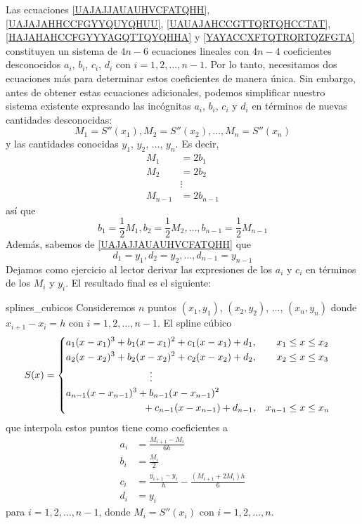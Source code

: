 Las ecuaciones \eqref{UAJAJJAUAUHVCFATQHH}, \eqref{UAJAJAHHCCFGYYQUYQHUU}, \eqref{UAUAJAHCCGTTQRTQHCCTAT}, \eqref{HAJAHAHCCFGYYYAGQTTQYQHHA} y \eqref{YAYACCXFTQTRQRTQZFGTA} constituyen un sistema de $4n - 6$ ecuaciones lineales con $4n - 4$ coeficientes desconocidos $a_i$, $b_i$, $c_i$, $d_i$ con $i = 1, 2, \dots, n-1$. Por lo tanto, necesitamos dos ecuaciones más para determinar estos coeficientes de manera única. Sin embargo, antes de obtener estas ecuaciones adicionales, podemos simplificar nuestro sistema existente expresando las incógnitas $a_i$, $b_i$, $c_i$ y $d_i$ en términos de nuevas cantidades desconocidas:
$$M_1 = S''(x_1), M_2 = S''(x_2), \dots, M_n = S''(x_n)$$
y las cantidades conocidas $y_1$, $y_2$, $\dots$, $y_n$. Es decir,
\begin{align*}
    M_1 & = 2b_1 \\
    M_2 & = 2b_2 \\
    & \vdots \\
    M_{n-1} & = 2b_{n-1}
\end{align*}\newpage\noindent
así que
$$b_1 = \frac{1}{2}M_1, b_2 = \frac{1}{2}M_2, \dots, b_{n-1} = \frac{1}{2}M_{n-1}$$
Además, sabemos de \eqref{UAJAJJAUAUHVCFATQHH} que
$$d_1 = y_1, d_2 = y_2, \dots, d_{n-1} = y_{n-1}$$
Dejamos como ejercicio al lector derivar las expresiones de los $a_i$ y $c_i$ en términos de los $M_i$ y $y_i$. El resultado final es el siguiente:
\begin{theorem}{}{splines_cubicos}
    Consideremos $n$ puntos $(x_1, y_1)$, $(x_2, y_2)$, $\dots$, $(x_n, y_n)$ donde $x_{i+1} - x_i = h$ con $i = 1, 2, \dots, n - 1$. El spline cúbico
    $$S(x) = \begin{cases}
        \begin{aligned}
            & a_1(x - x_1)^3 + b_1(x - x_1)^2 + c_1(x - x_1) + d_1, & x_1 & \leq x \leq x_2 \\
            & a_2(x - x_2)^3 + b_2(x - x_2)^2 + c_2(x - x_2) + d_2, & x_2 & \leq x \leq x_3 \\
            & \hspace{3cm} \vdots & & \\
            & a_{n-1}(x - x_{n-1})^3 + b_{n-1}(x - x_{n-1})^2 & & \\
            & \hspace{2.75cm} + c_{n-1}(x - x_{n-1}) + d_{n-1}, & x_{n-1} & \leq x \leq x_n
        \end{aligned}
    \end{cases}$$
    que interpola estos puntos tiene como coeficientes a
    \begin{equation}
        \begin{aligned}
            a_i & = \frac{M_{i+1} - M_i}{6h} \\
            b_i & = \frac{M_i}{2} \\
            c_i & = \frac{y_{i+1} - y_i}{h} - \frac{(M_{i+1} + 2M_i)h}{6} \\
            d_i & = y_i
        \end{aligned} \label{JAJAJAIIQIQUQJAHHAVGH}
    \end{equation}
    para $i = 1, 2, \dots, n - 1$, donde $M_i = S''(x_i)$ con $i = 1, 2, \dots, n$.
\end{theorem}

